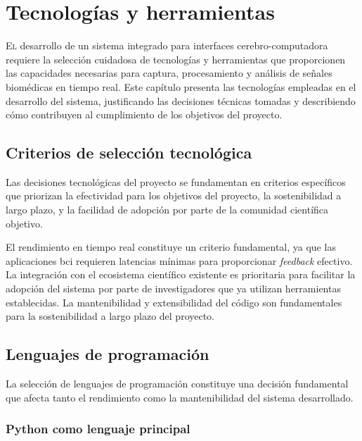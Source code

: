 \chapter{Tecnologías y herramientas}
\label{chap:tecnologias}

\lettrine{E}{l} desarrollo de un sistema integrado para interfaces cerebro-computadora requiere la selección cuidadosa de tecnologías y herramientas que proporcionen las capacidades necesarias para captura, procesamiento y análisis de señales biomédicas en tiempo real. Este capítulo presenta las tecnologías empleadas en el desarrollo del sistema, justificando las decisiones técnicas tomadas y describiendo cómo contribuyen al cumplimiento de los objetivos del proyecto.

\section{Criterios de selección tecnológica}
\label{sec:criterios_seleccion}

Las decisiones tecnológicas del proyecto se fundamentan en criterios específicos que priorizan la efectividad para los objetivos del proyecto, la sostenibilidad a largo plazo, y la facilidad de adopción por parte de la comunidad científica objetivo.

El rendimiento en tiempo real constituye un criterio fundamental, ya que las aplicaciones \acrshort{bci} requieren latencias mínimas para proporcionar \textit{feedback} efectivo. La integración con el ecosistema científico existente es prioritaria para facilitar la adopción del sistema por parte de investigadores que ya utilizan herramientas establecidas. La mantenibilidad y extensibilidad del código son fundamentales para la sostenibilidad a largo plazo del proyecto.

\section{Lenguajes de programación}
\label{sec:lenguajes_programacion}

La selección de lenguajes de programación constituye una decisión fundamental que afecta tanto el rendimiento como la mantenibilidad del sistema desarrollado.

\subsection{Python como lenguaje principal}
\label{subsec:python_principal}


